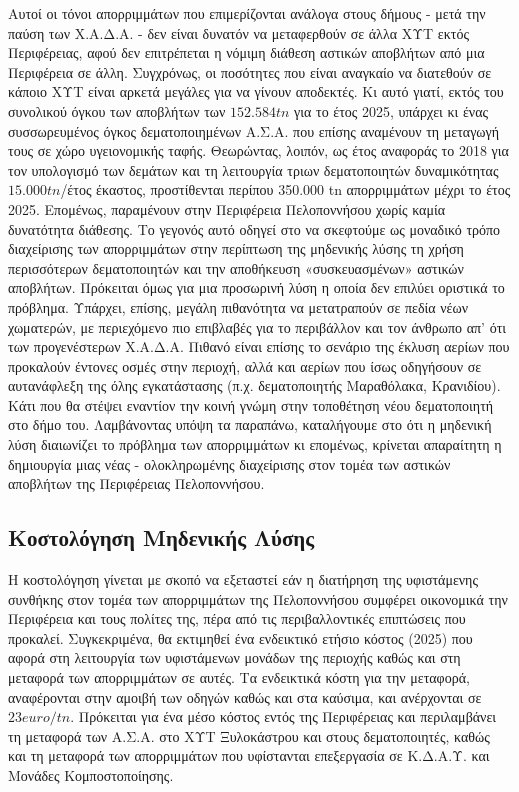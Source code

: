 \documentclass[12pt]{article}
\begin{document}
	Αυτοί οι τόνοι απορριμμάτων που επιμερίζονται ανάλογα στους δήμους - μετά την παύση των Χ.Α.Δ.Α. - δεν είναι δυνατόν να μεταφερθούν σε άλλα ΧΥΤ εκτός Περιφέρειας, αφού δεν επιτρέπεται η νόμιμη διάθεση αστικών αποβλήτων από μια Περιφέρεια σε άλλη. Συγχρόνως, οι ποσότητες που είναι αναγκαίο να διατεθούν σε κάποιο ΧΥΤ είναι αρκετά μεγάλες για να γίνουν αποδεκτές. Κι αυτό γιατί, εκτός του συνολικού όγκου των αποβλήτων των $152.584 tn$ για το έτος 2025, υπάρχει κι ένας συσσωρευμένος όγκος δεματοποιημένων Α.Σ.Α. που επίσης αναμένουν τη μεταγωγή τους σε χώρο υγειονομικής ταφής. Θεωρώντας, λοιπόν, ως έτος αναφοράς το 2018 για τον υπολογισμό των δεμάτων και τη λειτουργία τριων δεματοποιητών δυναμικότητας $15.000 tn$/έτος έκαστος, προστίθενται περίπου 350.000 tn απορριμμάτων μέχρι το έτος 2025. Επομένως, παραμένουν στην Περιφέρεια Πελοποννήσου χωρίς καμία δυνατότητα διάθεσης. Το γεγονός αυτό οδηγεί στο να σκεφτούμε ως μοναδικό τρόπο διαχείρισης των απορριμμάτων στην περίπτωση της μηδενικής λύσης τη χρήση περισσότερων δεματοποιητών και την αποθήκευση «συσκευασμένων» αστικών αποβλήτων. Πρόκειται όμως για μια προσωρινή λύση η οποία δεν επιλύει οριστικά το πρόβλημα. Υπάρχει, επίσης, μεγάλη πιθανότητα να μετατραπούν σε πεδία νέων χωματερών, με περιεχόμενο πιο επιβλαβές για το περιβάλλον και τον άνθρωπο απ’ ότι των προγενέστερων Χ.Α.Δ.Α. Πιθανό είναι επίσης το σενάριο της έκλυση αερίων που προκαλούν έντονες οσμές στην περιοχή, αλλά και αερίων που ίσως οδηγήσουν σε αυτανάφλεξη της όλης εγκατάστασης (π.χ. δεματοποιητής Μαραθόλακα, Κρανιδίου). Κάτι που θα στέψει εναντίον την κοινή γνώμη στην τοποθέτηση νέου δεματοποιητή στο δήμο του. Λαμβάνοντας υπόψη τα παραπάνω, καταλήγουμε στο ότι η μηδενική λύση διαιωνίζει το πρόβλημα των απορριμμάτων κι επομένως, κρίνεται απαραίτητη η δημιουργία μιας νέας - ολοκληρωμένης διαχείρισης στον τομέα των αστικών αποβλήτων της Περιφέρειας Πελοποννήσου. 
	
	\subsection{Κοστολόγηση Μηδενικής Λύσης}
	
	Η κοστολόγηση γίνεται με σκοπό να εξεταστεί εάν η διατήρηση της υφιστάμενης συνθήκης στον τομέα των απορριμμάτων της Πελοποννήσου συμφέρει οικονομικά την Περιφέρεια και τους πολίτες της, πέρα από τις περιβαλλοντικές επιπτώσεις που προκαλεί. Συγκεκριμένα, θα εκτιμηθεί ένα ενδεικτικό ετήσιο κόστος (2025) που αφορά στη λειτουργία των υφιστάμενων μονάδων της περιοχής καθώς και στη μεταφορά των απορριμμάτων σε αυτές. Τα ενδεικτικά κόστη για την μεταφορά, αναφέρονται στην αμοιβή των οδηγών καθώς και στα καύσιμα, και ανέρχονται σε $23 euro/tn$. Πρόκειται για ένα μέσο κόστος εντός της Περιφέρειας και περιλαμβάνει τη μεταφορά των Α.Σ.Α. στο ΧΥΤ Ξυλοκάστρου και στους δεματοποιητές, καθώς και τη μεταφορά των απορριμμάτων που υφίστανται επεξεργασία σε Κ.Δ.Α.Υ. και Μονάδες Κομποστοποίησης.
	
\end{document}
